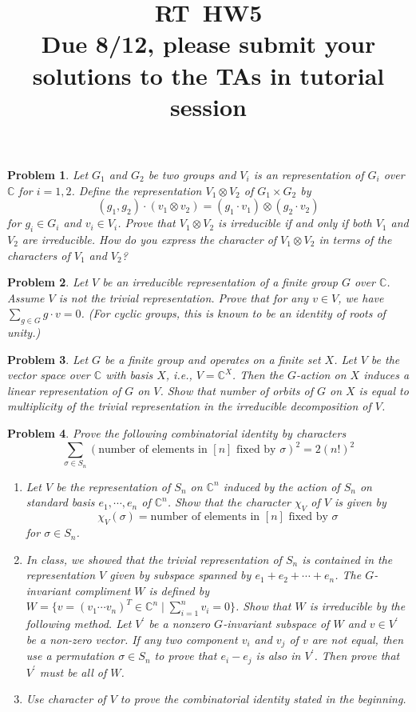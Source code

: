 \documentclass{article}
\title{RT\ HW5 \\ Due 8/12, please submit your solutions to the TAs in tutorial session}
\newtheorem{ex}{Problem}
\newcommand{\C}{\mathbb{C}}
\begin{document}
\maketitle      

\begin{ex}
  Let $G_1$ and $G_2$ be two groups and $V_i$ is an representation of $G_i$ over $\C$ for $i=1,2$. Define the representation $V_1 \otimes V_2$ of $G_1 \times G_2$ by
  \[
  (g_1, g_2) \cdot (v_1\otimes v_2) = (g_1 \cdot v_1)\otimes(g_2 \cdot v_2)
  \]
  for $g_i \in G_i$ and $v_i \in V_i$.
  Prove that $V_1 \otimes V_2$ is irreducible if and only if both $V_1$ and $V_2$ are irreducible. How do you express the character of $V_1 \otimes V_2$ in terms of the characters of $V_1$ and $V_2$?
\end{ex}

\begin{ex}
  Let $V$ be an irreducible representation of a finite group $G$ over $\C$. Assume $V$ is not the trivial representation. Prove that for any $v\in V$, we have $\sum_{g \in G} g \cdot v = 0$. (For cyclic groups, this is known to be an identity of roots of unity.)
\end{ex}

\begin{ex}
  Let $G$ be a finite group and operates on a finite set $X$. Let $V$ be the vector space over $\C$ with basis $X$, i.e., $V = \C^X$. Then the $G$-action on $X$ induces a linear representation of $G$ on $V$. Show that number of orbits of $G$ on $X$ is equal to multiplicity of the trivial representation in the irreducible decomposition of $V$.
\end{ex}

\begin{ex}
Prove the following combinatorial identity by characters
\[\sum_{\sigma\in S_n}(\text{number of elements in }[n]\text{ fixed by }\sigma)^2=2(n!)^2\]
\begin{enumerate}
  \item Let $V$ be the representation of $S_n$ on $\C^n$ induced by the action of $S_n$ on standard basis $e_1, \cdots, e_n$ of $\C^n$. Show that the character $\chi_V$ of $V$ is given by
  \[\chi_V(\sigma) = \text{number of elements in }[n]\text{ fixed by }\sigma\]
  for $\sigma \in S_n$.
  \item In class, we showed that the trivial representation of $S_n$ is contained in the representation $V$ given by subspace spanned by $e_1 + e_2 + \cdots + e_n$. The $G$-invariant compliment $W$ is defined by $W = \{v=(v_1\cdots v_n)^T \in \C^n \mid \sum_{i=1}^n v_i = 0\}$. Show that $W$ is irreducible by the following method. Let $V^\prime$ be a nonzero $G$-invariant subspace of $W$ and $v\in V^\prime$ be a non-zero vector. If any two component $v_i$ and $v_j$ of $v$ are not equal, then use a permutation $\sigma \in S_n$ to prove that $e_i-e_j$ is also in $V^\prime$. Then prove that $V^\prime$ must be all of $W$.
  \item Use character of $V$ to prove the combinatorial identity stated in the beginning.
  
\end{enumerate}
\end{ex}
\end{document}
